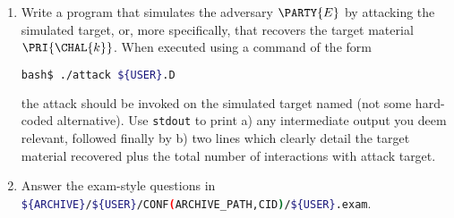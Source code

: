 \documentclass[crop={false},multi={true},tikz={true}]{standalone}
\begin{document}
\begin{enumerate}
\item Write a program that simulates the adversary $\PARTY{E}$ by attacking
      the simulated target, or, more specifically, that recovers the target 
      material $\PRI{\CHAL{k}}$.  
      When executed using a command of the form

      \begin{lstlisting}[language={bash},gobble={6}]
      bash$ ./attack ${USER}.D
      \end{lstlisting}

      \noindent
      the attack should be invoked on the simulated target named (not some
      hard-coded alternative).  Use \lstinline[language={bash}]{stdout} to 
      print 
      a) any intermediate output you deem relevant, followed finally by 
      b) two lines which clearly detail the target material recovered plus
         the total number of interactions with attack target.
\item Answer the exam-style questions in 
      \lstinline[language={bash}]|${ARCHIVE}/${USER}/CONF(ARCHIVE_PATH,CID)/${USER}.exam|.
\end{enumerate}


\ifstandalone
\printbibliography
\fi
\end{document}
